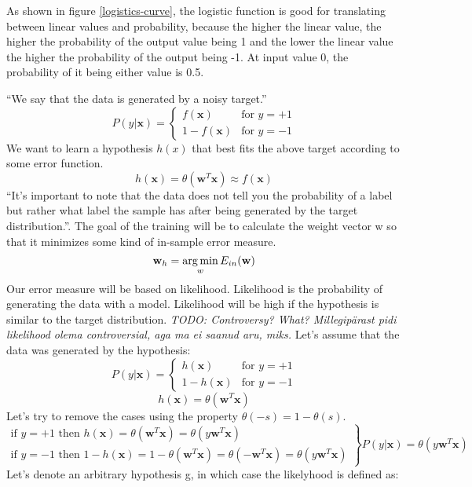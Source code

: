 As shown in figure \ref{logistics-curve}, the logistic function is good for
translating between linear values and probability, because the higher the linear value, the higher the probability of the output value being 1 and the lower the linear value the higher the probability of the output being -1. At input value 0, the probability of it being either value is 0.5.

``We say that the data is generated by a noisy
target.''\cite{logistic-regression} 
\[ P(y|\mathbf{x}) = \left\{
\begin{array}{ll}
f(\mathbf{x}) & \mbox{for } y = +1 \\
1 - f(\mathbf{x}) & \mbox{for } y = -1
\end{array} \right. \]
We want to learn a hypothesis $h(x)$ that best fits the above target according to some error function.
\[h(\mathbf{x}) = \theta \left( \mathbf{w}^T \mathbf{x} \right)\approx f(\mathbf{x})\]
``It's important to note that the data does not tell you the probability of a
label but rather what label the sample has after being generated by the target
distribution.''\cite{logistic-regression}. The goal of the training will be to calculate the weight vector w so that it minimizes some kind of in-sample error measure.
\[\mathbf{w}_h = \operatorname*{arg\,min}_w E_{in} (\mathbf{w})\]
Our error measure will be based on likelihood. Likelihood is the probability of generating the data with a model. Likelihood will be high if the hypothesis is similar to the target distribution. \emph{TODO: Controversy? What? Millegipärast pidi likelihood olema controversial, aga ma ei saanud aru, miks.} Let's assume that the data was generated by the hypothesis:
\[P(y|\mathbf{x}) = \left\{ 
\begin{array}{ll}
h(\mathbf{x}) & \mbox{for } y = + 1 \\
1 - h(\mathbf{x}) & \mbox{for } y = -1
\end{array}
\right.\]
\[h(\mathbf{x}) = \theta (\mathbf{w}^T \mathbf{x})\]
Let's try to remove the cases using the property $\theta(-s) = 1 - \theta (s)$.
\[\left.
\begin{array}{l}
\mbox{if $y=+1$ then } h(\mathbf{x}) = \theta (\mathbf{w}^T \mathbf{x}) = \theta (y \mathbf{w}^T \mathbf{x}) \\
\mbox{if $y=-1$ then } 1 - h(\mathbf{x}) = 1 - \theta (\mathbf{w}^T \mathbf{x}) = \theta (-\mathbf{w}^T \mathbf{x}) = \theta (y \mathbf{w}^T \mathbf{x})
\end{array}
\right\} P(y | \mathbf{x}) = \theta(y \mathbf{w}^T \mathbf{x})\]
Let's denote an arbitrary hypothesis g, in which case the likelyhood is defined as:
